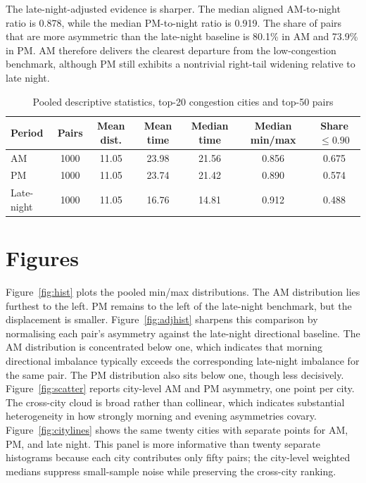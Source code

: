 \documentclass[12pt]{article}
\begin{document}
The late-night-adjusted evidence is sharper. The median aligned AM-to-night ratio is 0.878, while the median PM-to-night ratio is 0.919. The share of pairs that are more asymmetric than the late-night baseline is 80.1\% in AM and 73.9\% in PM. AM therefore delivers the clearest departure from the low-congestion benchmark, although PM still exhibits a nontrivial right-tail widening relative to late night.

\begin{table}[h!]
\centering
\caption{Pooled descriptive statistics, top-20 congestion cities and top-50 pairs}
\label{tab:summary}
\footnotesize
\setlength{\tabcolsep}{4pt}
\begin{tabular}{lcccccc}
\toprule
Period & Pairs & Mean dist. & Mean time & Median time & Median min/max & Share $\leq 0.90$ \\
\midrule
AM & 1000 & 11.05 & 23.98 & 21.56 & 0.856 & 0.675 \\
PM & 1000 & 11.05 & 23.74 & 21.42 & 0.890 & 0.574 \\
Late-night & 1000 & 11.05 & 16.76 & 14.81 & 0.912 & 0.488 \\
\bottomrule
\end{tabular}
\end{table}

\section*{Figures}

Figure~\ref{fig:hist} plots the pooled min/max distributions. The AM distribution lies furthest to the left. PM remains to the left of the late-night benchmark, but the displacement is smaller. Figure~\ref{fig:adjhist} sharpens this comparison by normalising each pair's asymmetry against the late-night directional baseline. The AM distribution is concentrated below one, which indicates that morning directional imbalance typically exceeds the corresponding late-night imbalance for the same pair. The PM distribution also sits below one, though less decisively. Figure~\ref{fig:scatter} reports city-level AM and PM asymmetry, one point per city. The cross-city cloud is broad rather than collinear, which indicates substantial heterogeneity in how strongly morning and evening asymmetries covary. Figure~\ref{fig:citylines} shows the same twenty cities with separate points for AM, PM, and late night. This panel is more informative than twenty separate histograms because each city contributes only fifty pairs; the city-level weighted medians suppress small-sample noise while preserving the cross-city ranking.
\end{document}
